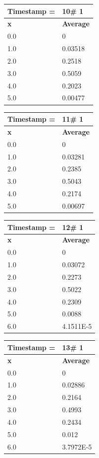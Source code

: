 \begin{tabular}{|l||l|}
\hline
\textbf{Timestamp =} & \textbf{10}\# 1\\\hline
	\textbf{x} & \textbf{Average} \\ \hline
\hline
	0.0 & 0 \\ \hline
	1.0 & 0.03518 \\ \hline
	2.0 & 0.2518 \\ \hline
	3.0 & 0.5059 \\ \hline
	4.0 & 0.2023 \\ \hline
	5.0 & 0.00477 \\ \hline
\end{tabular}
\begin{tabular}{|l||l|}
\hline
\textbf{Timestamp =} & \textbf{11}\# 1\\\hline
	\textbf{x} & \textbf{Average} \\ \hline
\hline
	0.0 & 0 \\ \hline
	1.0 & 0.03281 \\ \hline
	2.0 & 0.2385 \\ \hline
	3.0 & 0.5043 \\ \hline
	4.0 & 0.2174 \\ \hline
	5.0 & 0.00697 \\ \hline
\end{tabular}

\begin{tabular}{|l||l|}
\hline
\textbf{Timestamp =} & \textbf{12}\# 1\\\hline
	\textbf{x} & \textbf{Average} \\ \hline
\hline
	0.0 & 0 \\ \hline
	1.0 & 0.03072 \\ \hline
	2.0 & 0.2273 \\ \hline
	3.0 & 0.5022 \\ \hline
	4.0 & 0.2309 \\ \hline
	5.0 & 0.0088 \\ \hline
	6.0 & 4.1511E-5 \\ \hline
\end{tabular}
\begin{tabular}{|l||l|}
\hline
\textbf{Timestamp =} & \textbf{13}\# 1\\\hline
	\textbf{x} & \textbf{Average} \\ \hline
\hline
	0.0 & 0 \\ \hline
	1.0 & 0.02886 \\ \hline
	2.0 & 0.2164 \\ \hline
	3.0 & 0.4993 \\ \hline
	4.0 & 0.2434 \\ \hline
	5.0 & 0.012 \\ \hline
	6.0 & 3.7972E-5 \\ \hline
\end{tabular}

